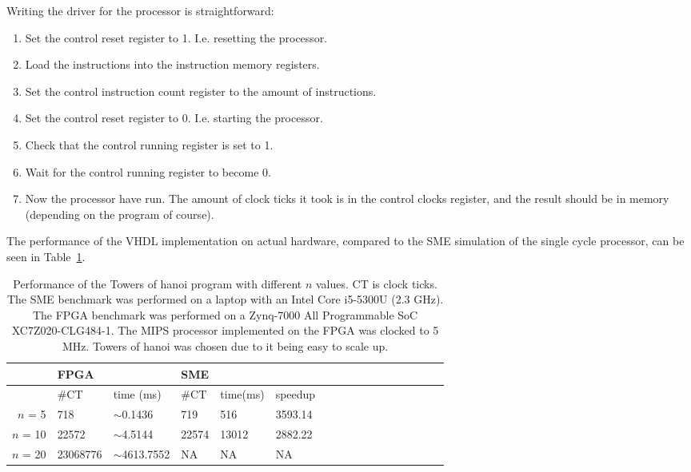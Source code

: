 Writing the driver for the processor is straightforward:
\begin{enumerate}
    \item Set the control reset register to 1. I.e. resetting the processor.

    \item Load the instructions into the instruction memory registers.

    \item Set the control instruction count register to the amount of instructions.

    \item Set the control reset register to 0. I.e. starting the processor.

    \item Check that the control running register is set to 1.

    \item Wait for the control running register to become 0.

    \item Now the processor have run. The amount of clock ticks it took is in
        the control clocks register, and the result should be in memory
        (depending on the program of course).
\end{enumerate}
The performance of the VHDL implementation on actual hardware, compared to the
SME simulation of the single cycle processor, can be seen in
Table~\ref{tab:single-cycle-hardware}.

\begin{table}
    \centering
    \begin{tabular}{rllllllllllllllll}
        & FPGA &           & SME \\
        \hline
        & \#CT & time (ms) & \#CT & time(ms) & speedup \\
        \hline
        $n$ = 5 & 718 & $\sim$0.1436 & 719 & 516 & 3593.14 \\
        $n$ = 10 & 22572 & $\sim$4.5144 & 22574 & 13012 & 2882.22 \\
        $n$ = 20 & 23068776 & $\sim$4613.7552 & NA & NA & NA \\
        \hline
    \end{tabular}
    \caption{Performance of the Towers of hanoi program with different $n$
    values. CT is clock ticks. The SME benchmark was performed on a laptop
    with an Intel Core i5-5300U (2.3 GHz). The FPGA benchmark was performed on
    a Zynq-7000 All Programmable SoC XC7Z020-CLG484-1. The MIPS processor
    implemented on the FPGA was clocked to 5 MHz. Towers of hanoi was chosen
    due to it being easy to scale up.}
    \label{tab:single-cycle-hardware}
\end{table}

